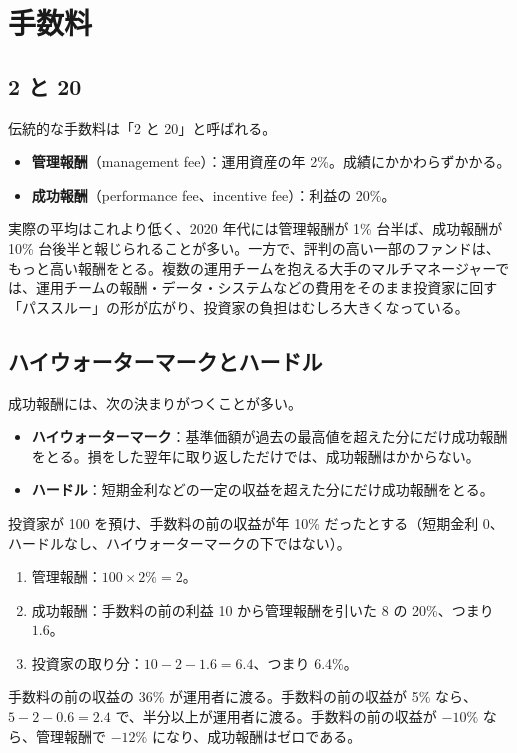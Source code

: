 \section{手数料}
\label{sec:fees}

\subsection{2 と 20}

伝統的な手数料は「2 と 20」と呼ばれる。

\begin{itemize}
\item \textbf{管理報酬}（management fee）：運用資産の年 2\%。成績にかかわらずかかる。
\item \textbf{成功報酬}（performance fee、incentive fee）：利益の 20\%。
\end{itemize}

実際の平均はこれより低く、2020 年代には管理報酬が 1\% 台半ば、成功報酬が 10\% 台後半と報じられることが多い。一方で、評判の高い一部のファンドは、もっと高い報酬をとる。複数の運用チームを抱える大手のマルチマネージャーでは、運用チームの報酬・データ・システムなどの費用をそのまま投資家に回す「パススルー」の形が広がり、投資家の負担はむしろ大きくなっている。

\subsection{ハイウォーターマークとハードル}

成功報酬には、次の決まりがつくことが多い。

\begin{itemize}
\item \textbf{ハイウォーターマーク}：基準価額が過去の最高値を超えた分にだけ成功報酬をとる。損をした翌年に取り返しただけでは、成功報酬はかからない。
\item \textbf{ハードル}：短期金利などの一定の収益を超えた分にだけ成功報酬をとる。
\end{itemize}

\begin{exbox}[手数料の計算]
投資家が 100 を預け、手数料の前の収益が年 10\% だったとする（短期金利 0、ハードルなし、ハイウォーターマークの下ではない）。
\begin{enumerate}
\item 管理報酬：$100 \times 2\% = 2$。
\item 成功報酬：手数料の前の利益 10 から管理報酬を引いた 8 の 20\%、つまり $1.6$。
\item 投資家の取り分：$10 - 2 - 1.6 = 6.4$、つまり 6.4\%。
\end{enumerate}
手数料の前の収益の 36\% が運用者に渡る。手数料の前の収益が 5\% なら、$5 - 2 - 0.6 = 2.4$ で、半分以上が運用者に渡る。手数料の前の収益が $-10\%$ なら、管理報酬で $-12\%$ になり、成功報酬はゼロである。
\end{exbox}


